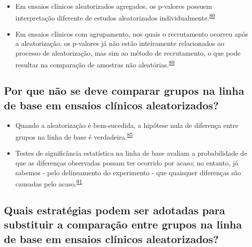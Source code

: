 \documentclass[
]{book}
\begin{document}
\begin{itemize}
\item
  Em ensaios clínicos aleatorizados agregados, os p-valores possuem interpretação diferente de estudos aleatorizados individualmente.\textsuperscript{\protect\hyperlink{ref-Bolzern2019}{89}}
\item
  Em ensaios clínicos com agrupamento, nos quais o recrutamento ocorreu após a aleatorização, os p-valores já não estão inteiramente relacionados ao processo de aleatorização, mas sim ao método de recrutamento, o que pode resultar na comparação de amostras não aleatórias.\textsuperscript{\protect\hyperlink{ref-Bolzern2019}{89}}
\end{itemize}

\hypertarget{por-que-nuxe3o-se-deve-comparar-grupos-na-linha-de-base-em-ensaios-cluxednicos-aleatorizados}{%
\subsection{Por que não se deve comparar grupos na linha de base em ensaios clínicos aleatorizados?}\label{por-que-nuxe3o-se-deve-comparar-grupos-na-linha-de-base-em-ensaios-cluxednicos-aleatorizados}}

\begin{itemize}
\item
  Quando a aleatorização é bem-sucedida, a hipótese nula de diferença entre grupos na linha de base é verdadeira.\textsuperscript{\protect\hyperlink{ref-roberts1999}{85}}
\item
  Testes de significância estatística na linha de base avaliam a probabilidade de que as diferenças observadas possam ter ocorrido por acaso; no entanto, já sabemos - pelo delineamento do experimento - que quaisquer diferenças são causadas pelo acaso.\textsuperscript{\protect\hyperlink{ref-gruijters2020}{91}}
\end{itemize}

\hypertarget{quais-estratuxe9gias-podem-ser-adotadas-para-substituir-a-comparauxe7uxe3o-entre-grupos-na-linha-de-base-em-ensaios-cluxednicos-aleatorizados}{%
\subsection{Quais estratégias podem ser adotadas para substituir a comparação entre grupos na linha de base em ensaios clínicos aleatorizados?}\label{quais-estratuxe9gias-podem-ser-adotadas-para-substituir-a-comparauxe7uxe3o-entre-grupos-na-linha-de-base-em-ensaios-cluxednicos-aleatorizados}}
\end{document}
